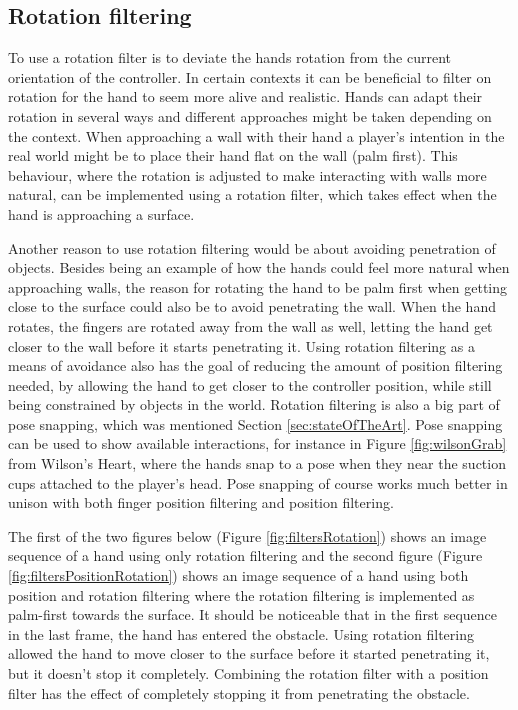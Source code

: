 \subsection{Rotation filtering}
\label{subsec:categoryRotationFiltering}
To use a rotation filter is to deviate the hands rotation from the current orientation of the controller. In certain contexts it can be beneficial to filter on rotation for the hand to seem more alive and realistic. Hands can adapt their rotation in several ways and different approaches might be taken depending on the context. When approaching a wall with their hand a player's intention in the real world might be to place their hand flat on the wall (palm first). This behaviour, where the rotation is adjusted to make interacting with walls more natural, can be implemented using a rotation filter, which takes effect when the hand is approaching a surface.

Another reason to use rotation filtering would be about avoiding penetration of objects. Besides being an example of how the hands could feel more natural when approaching walls, the reason for rotating the hand to be palm first when getting close to the surface could also be to avoid penetrating the wall. When the hand rotates, the fingers are rotated away from the wall as well, letting the hand get closer to the wall before it starts penetrating it. Using rotation filtering as a means of avoidance also has the goal of reducing the amount of position filtering needed, by allowing the hand to get closer to the controller position, while still being constrained by objects in the world. Rotation filtering is also a big part of pose snapping, which was mentioned Section \ref{sec:stateOfTheArt}. Pose snapping can be used to show available interactions, for instance in Figure \ref{fig:wilsonGrab} from Wilson's Heart, where the hands snap to a pose when they near the suction cups attached to the player's head. Pose snapping of course works much better in unison with both finger position filtering and position filtering.

The first of the two figures below (Figure \ref{fig:filtersRotation}) shows an image sequence of a hand using only rotation filtering and the second figure (Figure \ref{fig:filtersPositionRotation}) shows an image sequence of a hand using both position and rotation filtering where the rotation filtering is implemented as palm-first towards the surface. It should be noticeable that in the first sequence in the last frame, the hand has entered the obstacle. Using rotation filtering allowed the hand to move closer to the surface before it started penetrating it, but it doesn't stop it completely. Combining the rotation filter with a position filter has the effect of completely stopping it from penetrating the obstacle.

